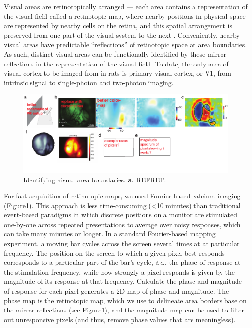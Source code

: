 Visual areas are retinotopically arranged --- each area contains a representation of the visual field called a retinotopic map, where nearby positions in physical space are represented by nearby cells on the retina, and this spatial arrangement is preserved from one part of the visual system to the next \cite{REFREF}. Conveniently, nearby visual areas have predictable ``reflections'' of retinotopic space at area boundaries. As such, distinct visual areas can be functionally identified by these mirror reflections in the representation of the visual field. To date, the only area of visual cortex to be imaged from in rats is primary visual cortex, or V1, from intrinsic signal \cite{Gias2004} to single-photon \cite{Scott2018ImagingMacroscope} and two-photon \cite{Ohki2005, Greenberg2008} imaging.

\begin{figure}
    \includegraphics[width=\textwidth]{figures/chapter_2/retino_mapping.pdf}
    \vspace{.1in}
    \caption[Retinotopic mapping]{Identifying visual area boundaries. \textbf{a.} REFREF.
    \label{fig:retino_mapping}}
\end{figure}

For fast acquisition of retinotopic maps, we used Fourier-based calcium imaging\cite{Kalatsky2003} (Figure\ref{fig:retino_mapping}). This approach is less time-consuming (<10 minutes) than traditional event-based paradigms in which discrete positions on a monitor are stimulated one-by-one across repeated presentations to average over noisy responses, which can take many minutes or longer. In a standard Fourier-based mapping experiment, a moving bar cycles across the screen several times at at particular frequency. The position on the screen to which a given pixel best responds corresponds to a particular part of the bar's cycle, \textit{i.e.}, the phase of response at the stimulation frequency, while how strongly a pixel responds is given by the magnitude of its response at that frequency. Calculate the phase and magnitude of response for each pixel generates a 2D map of phase and magnitude. The phase map is the retinotopic map, which we use to delineate area borders base on the mirror reflections (see Figure\ref{fig:retino_mapping}), and the magnitude map can be used to filter out unresponsive pixels (and thus, remove phase values that are meaningless). 

